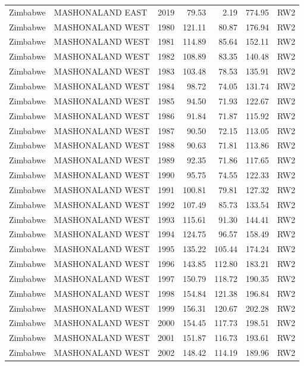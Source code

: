 \begin{longtable}{lllrrrl}
  Zimbabwe & MASHONALAND EAST & 2019 & 79.53 & 2.19 & 774.95 & RW2 \\ 
  Zimbabwe & MASHONALAND WEST & 1980 & 121.11 & 80.87 & 176.94 & RW2 \\ 
  Zimbabwe & MASHONALAND WEST & 1981 & 114.89 & 85.64 & 152.11 & RW2 \\ 
  Zimbabwe & MASHONALAND WEST & 1982 & 108.89 & 83.35 & 140.48 & RW2 \\ 
  Zimbabwe & MASHONALAND WEST & 1983 & 103.48 & 78.53 & 135.91 & RW2 \\ 
  Zimbabwe & MASHONALAND WEST & 1984 & 98.72 & 74.05 & 131.74 & RW2 \\ 
  Zimbabwe & MASHONALAND WEST & 1985 & 94.50 & 71.93 & 122.67 & RW2 \\ 
  Zimbabwe & MASHONALAND WEST & 1986 & 91.84 & 71.87 & 115.92 & RW2 \\ 
  Zimbabwe & MASHONALAND WEST & 1987 & 90.50 & 72.15 & 113.05 & RW2 \\ 
  Zimbabwe & MASHONALAND WEST & 1988 & 90.63 & 71.81 & 113.86 & RW2 \\ 
  Zimbabwe & MASHONALAND WEST & 1989 & 92.35 & 71.86 & 117.65 & RW2 \\ 
  Zimbabwe & MASHONALAND WEST & 1990 & 95.75 & 74.55 & 122.33 & RW2 \\ 
  Zimbabwe & MASHONALAND WEST & 1991 & 100.81 & 79.81 & 127.32 & RW2 \\ 
  Zimbabwe & MASHONALAND WEST & 1992 & 107.49 & 85.73 & 133.54 & RW2 \\ 
  Zimbabwe & MASHONALAND WEST & 1993 & 115.61 & 91.30 & 144.41 & RW2 \\ 
  Zimbabwe & MASHONALAND WEST & 1994 & 124.75 & 96.57 & 158.49 & RW2 \\ 
  Zimbabwe & MASHONALAND WEST & 1995 & 135.22 & 105.44 & 174.24 & RW2 \\ 
  Zimbabwe & MASHONALAND WEST & 1996 & 143.85 & 112.80 & 183.21 & RW2 \\ 
  Zimbabwe & MASHONALAND WEST & 1997 & 150.79 & 118.72 & 190.35 & RW2 \\ 
  Zimbabwe & MASHONALAND WEST & 1998 & 154.84 & 121.38 & 196.84 & RW2 \\ 
  Zimbabwe & MASHONALAND WEST & 1999 & 156.31 & 120.67 & 202.28 & RW2 \\ 
  Zimbabwe & MASHONALAND WEST & 2000 & 154.45 & 117.73 & 198.51 & RW2 \\ 
  Zimbabwe & MASHONALAND WEST & 2001 & 151.87 & 116.73 & 193.61 & RW2 \\ 
  Zimbabwe & MASHONALAND WEST & 2002 & 148.42 & 114.19 & 189.96 & RW2 \\ 

\end{longtable}
